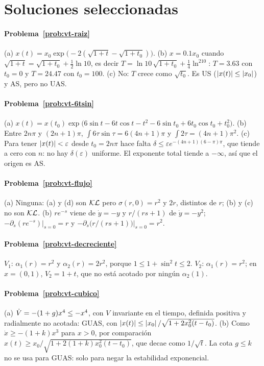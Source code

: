 \section{Soluciones seleccionadas}
\label{sec:vt-soluciones}

\paragraph{Problema~\ref{prob:vt-raiz}}
(a) $x(t)=x_0\exp\bigl(-2(\sqrt{1+t}-\sqrt{1+t_0})\bigr)$. (b) $x=0.1x_0$ cuando $\sqrt{1+t}=\sqrt{1+t_0}+\tfrac12\ln10$, es decir $T=\ln10\,\sqrt{1+t_0}+\tfrac14\ln^210$: $T=3.63$ con $t_0=0$ y $T=24.47$ con $t_0=100$. (c) No: $T$ crece como $\sqrt{t_0}$. Es US ($\left\lvert x(t)\right\rvert\le\left\lvert x_0\right\rvert$) y AS, pero no UAS.

\paragraph{Problema~\ref{prob:vt-6tsin}}
(a) $x(t)=x(t_0)\exp\bigl(6\sin t-6t\cos t-t^2-6\sin t_0+6t_0\cos t_0+t_0^2\bigr)$. (b) Entre $2n\pi$ y $(2n+1)\pi$, $\int6\tau\sin\tau=6(4n+1)\pi$ y $\int2\tau=(4n+1)\pi^2$. (c) Para tener $\left\lvert x(t)\right\rvert<\varepsilon$ desde $t_0=2n\pi$ hace falta $\delta\le\varepsilon e^{-(4n+1)(6-\pi)\pi}$, que tiende a cero con $n$: no hay $\delta(\varepsilon)$ uniforme. El exponente total tiende a $-\infty$, así que el origen es AS.

\paragraph{Problema~\ref{prob:vt-flujo}}
(a) Ninguna: (a) y (d) son $\mathcal{KL}$ pero $\sigma(r,0)=r^2$ y $2r$, distintos de $r$; (b) y (c) no son $\mathcal{KL}$. (b) $re^{-s}$ viene de $\dot y=-y$ y $r/(rs+1)$ de $\dot y=-y^2$; $-\partial_s(re^{-s})|_{s=0}=r$ y $-\partial_s\bigl(r/(rs+1)\bigr)|_{s=0}=r^2$.

\paragraph{Problema~\ref{prob:vt-decreciente}}
$V_1$: $\alpha_1(r)=r^2$ y $\alpha_2(r)=2r^2$, porque $1\le1+\sin^2t\le2$. $V_2$: $\alpha_1(r)=r^2$; en $x=(0,1)$, $V_2=1+t$, que no está acotado por ningún $\alpha_2(1)$.

\paragraph{Problema~\ref{prob:vt-cubico}}
(a) $\dot V=-(1+g)x^4\le-x^4$, con $V$ invariante en el tiempo, definida positiva y radialmente no acotada: GUAS, con $\left\lvert x(t)\right\rvert\le\left\lvert x_0\right\rvert/\sqrt{1+2x_0^2(t-t_0)}$. (b) Como $\dot x\ge-(1+k)x^3$ para $x>0$, por comparación $x(t)\ge x_0/\sqrt{1+2(1+k)x_0^2(t-t_0)}$, que decae como $1/\sqrt t$. La cota $g\le k$ no se usa para GUAS: solo para negar la estabilidad exponencial.

